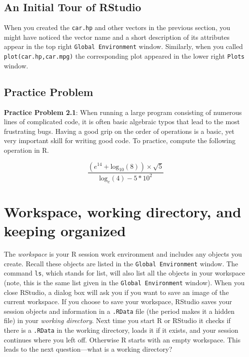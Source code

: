 \documentclass[
]{krantz}
\begin{document}
\hypertarget{an-initial-tour-of-rstudio}{%
\subsection{An Initial Tour of RStudio}\label{an-initial-tour-of-rstudio}}

When you created the \texttt{car.hp} and other vectors in the previous section, you might have noticed the vector name and a short description of its attributes appear in the top right \texttt{Global\ Environment} window. Similarly, when you called \texttt{plot(car.hp,car.mpg)} the corresponding plot appeared in the lower right \texttt{Plots} window.

\hypertarget{introRPractice}{%
\subsection{Practice Problem}\label{introRPractice}}

\textbf{Practice Problem 2.1}: When running a large program consisting of numerous lines of complicated code, it is often basic algebraic typos that lead to the most frustrating bugs. Having a good grip on the order of operations is a basic, yet very important skill for writing good code. To practice, compute the following operation in R.

\[
\frac{(e^{14} + \text{log}_{10}(8)) \times \sqrt{5}}{\text{log}_{e}(4) - 5 * 10^2}
\]

\hypertarget{workingDirectory}{%
\section{Workspace, working directory, and keeping organized}\label{workingDirectory}}

The \emph{workspace} is your R session work environment and includes any objects you create. Recall these objects are listed in the \texttt{Global\ Environment} window. The command \texttt{ls}, which stands for list, will also list all the objects in your workspace (note, this is the same list given in the \texttt{Global\ Environment} window). When you close RStudio, a dialog box will ask you if you want to save an image of the current workspace. If you choose to save your workspace, RStudio saves your session objects and information in a \texttt{.RData} file (the period makes it a hidden file) in your \emph{working directory}. Next time you start R or RStudio it checks if there is a \texttt{.RData} in the working directory, loads it if it exists, and your session continues where you left off. Otherwise R starts with an empty workspace. This leads to the next question---what is a working directory?
\end{document}
